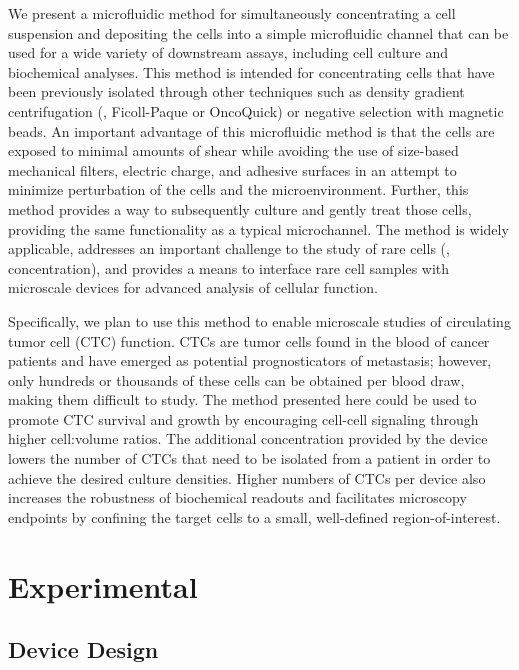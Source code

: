 We present a microfluidic method for simultaneously concentrating a cell suspension and depositing the cells into a simple microfluidic channel that can be used for a wide variety of downstream assays, including cell culture and biochemical analyses. This method is intended for concentrating cells that have been previously isolated through other techniques such as density gradient centrifugation (\eg , Ficoll-Paque or OncoQuick) or negative selection with magnetic beads. An important advantage of this microfluidic method is that the cells are exposed to minimal amounts of shear while avoiding the use of size-based mechanical filters, electric charge, and adhesive surfaces in an attempt to minimize perturbation of the cells and the microenvironment. Further, this method provides a way to subsequently culture and gently treat those cells, providing the same functionality as a typical microchannel. The method is widely applicable, addresses an important challenge to the study of rare cells (\ie , concentration), and provides a means to interface rare cell samples with microscale devices for advanced analysis of cellular function.

Specifically, we plan to use this method to enable microscale studies of circulating tumor cell (CTC) function. CTCs are tumor cells found in the blood of cancer patients and have emerged as potential prognosticators of metastasis; however, only hundreds or thousands of these cells can be obtained per blood draw, making them difficult to study\cite{Okegawa09}. The method presented here could be used to promote CTC survival and growth by encouraging cell-cell signaling through higher cell:volume ratios. The additional concentration provided by the device lowers the number of CTCs that need to be isolated from a patient in order to achieve the desired culture densities. Higher numbers of CTCs per device also increases the robustness of biochemical readouts and facilitates microscopy endpoints by confining the target cells to a small, well-defined region-of-interest.

\section{Experimental}

\subsection{Device Design}

